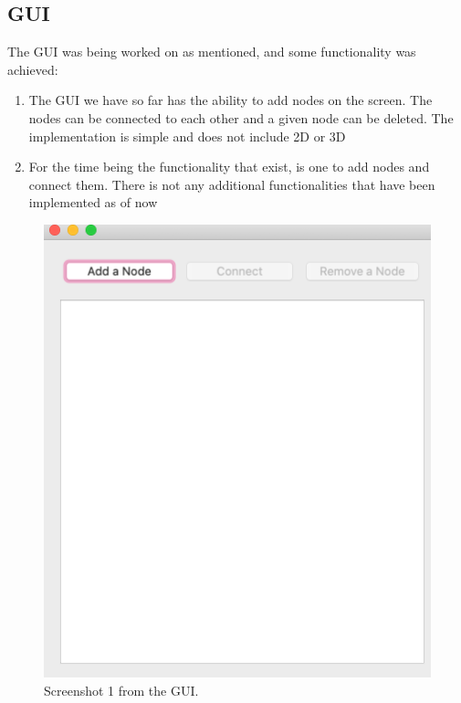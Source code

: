 \subsection{GUI}
The GUI was being worked on as mentioned, and some functionality was achieved:
\begin{enumerate}
    \item The GUI we have so far has the ability to add nodes on the screen. The nodes can be connected to each other and a given node can be deleted. The implementation is simple and does not include 2D or 3D
    \item For the time being the functionality that exist, is one to add nodes and connect them. There is not any additional functionalities that have been implemented as of now
\end{enumerate}

\begin{figure}[!htbp]
\begin{center}
	\includegraphics[width=13cm]{Screenshot 2020-08-27 at 14.03.23.png}
    \caption{Screenshot 1 from the GUI.}
	\label{img:gui-1}			%
\end{center}
\end{figure}

